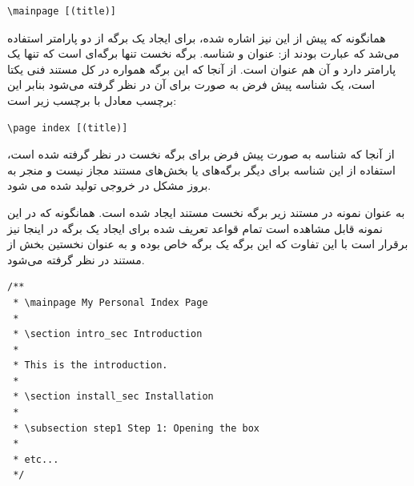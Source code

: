 \begin{latin}
\lstset{language=C++}  
\begin{lstlisting}[frame=single] 
\mainpage [(title)]
\end{lstlisting}
\end{latin}

همانگونه که پیش از این نیز اشاره شده، برای ایجاد یک برگه از دو پارامتر استفاده
می‌شد که عبارت بودند از: عنوان و شناسه. برگه نخست تنها برگه‌ای است که تنها یک
پارامتر دارد و آن هم عنوان است. از آنجا که این برگه همواره در کل مستند فنی یکتا
است، یک شناسه پیش فرض به صورت  برای آن در نظر گرفته می‌شود بنابر این
برچسب  معادل با برچسب زیر است:

\begin{latin}
\lstset{language=C++}  
\begin{lstlisting}[frame=single] 
\page index [(title)]
\end{lstlisting}
\end{latin}

\begin{warning}
از آنجا که شناسه  به صورت پیش فرض برای برگه نخست در نظر گرفته شده است،
استفاده از این شناسه برای دیگر برگه‌های یا بخش‌های مستند مجاز نیست و منجر به
بروز مشکل در خروجی تولید شده می شود.
\end{warning}

به عنوان نمونه در مستند زیر برگه نخست مستند ایجاد شده است. همانگونه که در این
نمونه قابل مشاهده است تمام قواعد تعریف شده برای ایجاد یک برگه در اینجا نیز
برقرار است با این تفاوت که این برگه یک برگه خاص بوده و به عنوان نخستین بخش از
مستند در نظر گرفته می‌شود.

\begin{latin}
\lstset{language=C++}  
\begin{lstlisting}[frame=single]
/** 
 * \mainpage My Personal Index Page
 *
 * \section intro_sec Introduction
 *
 * This is the introduction.
 *
 * \section install_sec Installation
 *
 * \subsection step1 Step 1: Opening the box
 *
 * etc...
 */
\end{lstlisting}
\end{latin}

